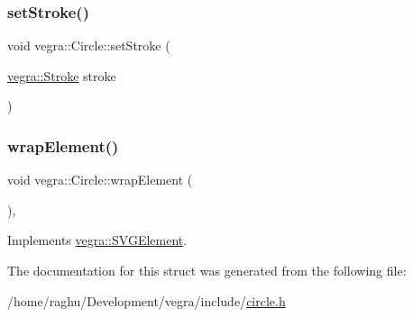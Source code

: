 \mbox{\label{structvegra_1_1Circle_a85efa989ca99a6639fe24918b19c78b3}} 
\subsubsection{\texorpdfstring{set\+Stroke()}{setStroke()}}
{\footnotesize\ttfamily void vegra\+::\+Circle\+::set\+Stroke (\begin{DoxyParamCaption}\item[{\mbox{\hyperlink{structvegra_1_1Stroke}{vegra\+::\+Stroke}}}]{stroke }\end{DoxyParamCaption})\hspace{0.3cm}{\ttfamily [inline]}}

\mbox{\label{structvegra_1_1Circle_a67bfa48e7697a6ee3e7c79fed1129a3c}} 
\subsubsection{\texorpdfstring{wrap\+Element()}{wrapElement()}}
{\footnotesize\ttfamily void vegra\+::\+Circle\+::wrap\+Element (\begin{DoxyParamCaption}{ }\end{DoxyParamCaption})\hspace{0.3cm}{\ttfamily [inline]}, {\ttfamily [virtual]}}



Implements \mbox{\hyperlink{structvegra_1_1SVGElement_a1369400ebe57287f1b5beb5f0234d8d7}{vegra\+::\+S\+V\+G\+Element}}.



The documentation for this struct was generated from the following file\+:\begin{DoxyCompactItemize}
\item 
/home/raghu/\+Development/vegra/include/\mbox{\hyperlink{circle_8h}{circle.\+h}}\end{DoxyCompactItemize}
